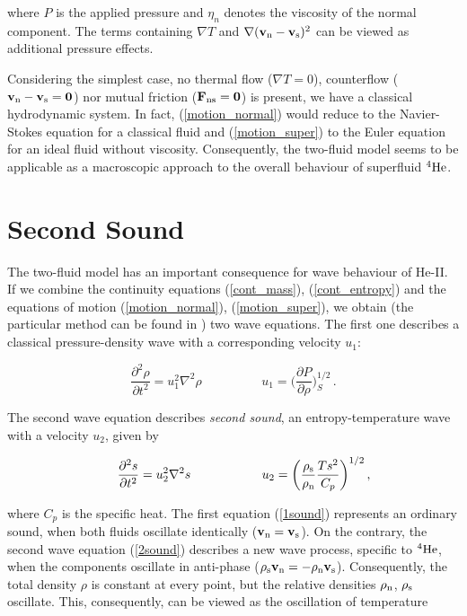 where $P$ is the applied pressure and $\eta_n$ denotes the viscosity of the normal component. The terms containing $\nabla T$ and $\nabla (\mathbf{v_{\mathrm{n}}} - \mathbf{v_{\mathrm{s}}})^2$ can be viewed as additional pressure effects.

Considering the simplest case, no thermal flow ($\nabla T = 0$), counterflow ($\mathbf{v_{\mathrm{n}}} - \mathbf{v_{\mathrm{s}}} = \mathbf{0}$) nor mutual friction ($\mathbf{F_{\mathrm{ns}}} = \mathbf{0}$) is present, we have a classical hydrodynamic system. In fact, (\ref{motion_normal}) would reduce to the Navier-Stokes equation for a classical fluid and (\ref{motion_super}) to the Euler equation for an ideal fluid without viscosity. Consequently, the two-fluid model seems to be applicable as a macroscopic approach to the overall behaviour of superfluid ${}^4\mathrm{He}$.

\section{Second Sound}

The two-fluid model has an important consequence for wave behaviour of He-II. If we combine the continuity equations (\ref{cont_mass}), (\ref{cont_entropy}) and the equations of motion (\ref{motion_normal}), (\ref{motion_super}), we obtain (the particular method can be found in \cite{varga}) two wave equations. The first one describes a classical pressure-density wave with a corresponding velocity $ u_1 $:

\begin{equation}
\frac{\partial^2 \rho}{\partial t^2} = u_1^2 \nabla^2 \rho
\hspace{2cm}
u_1 = \bigg( \frac{\partial P}{\partial \rho} \bigg)_S^{1/2}\,.
\label{1sound}
\end{equation}

The second wave equation describes \textit{second sound}, an entropy-temperature wave with a velocity $ u_2 $,  given by

\begin{equation}
\hspace{0.6cm}
\frac{\partial^2 s}{\partial t^2} = u_2^2 \nabla^2 s
\hspace{2cm}
u_2 = \bigg( \frac{\rho_{\mathrm{s}}}{\rho_{\mathrm{n}}} \frac{Ts^2}{C_p} \bigg )^{1/2}\,,
\label{2sound}
\end{equation}

where $C_p$ is the specific heat. The first equation (\ref{1sound}) represents an ordinary sound, when both fluids oscillate identically ($\mathbf{v_{\mathrm{n}}} = \mathbf{v_{\mathrm{s}}}$). On the contrary, the second wave equation (\ref{2sound}) describes a new wave process, specific to $ {}^4\mathrm{He} $, when the components oscillate in anti-phase ($\rho_{\mathrm{s}}\mathbf{v_{\mathrm{n}}} = -\rho_{\mathrm{n}}\mathbf{v_{\mathrm{s}}}$). Consequently, the total density $ \rho $ is constant at every point, but the relative densities $ \rho_{\mathrm{n}} $, $ \rho_{\mathrm{s}} $ oscillate. This, consequently, can be viewed as the oscillation of temperature

